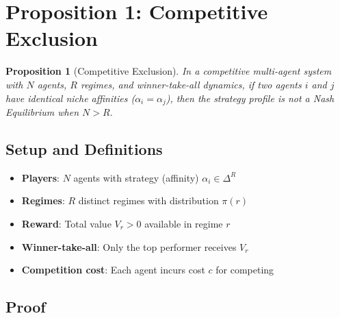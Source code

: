 \documentclass[11pt,a4paper]{article}
\theoremstyle{definition}
\theoremstyle{plain}
\newtheorem{proposition}{Proposition}[section]
\begin{document}
\section{Proposition 1: Competitive Exclusion}
\label{sec:prop1}

\begin{proposition}[Competitive Exclusion]
\label{prop:competitive-exclusion}
In a competitive multi-agent system with $N$ agents, $R$ regimes, and winner-take-all dynamics, if two agents $i$ and $j$ have identical niche affinities ($\alpha_i = \alpha_j$), then the strategy profile is not a Nash Equilibrium when $N > R$.
\end{proposition}

\subsection{Setup and Definitions}

\begin{itemize}
    \item \textbf{Players}: $N$ agents with strategy (affinity) $\alpha_i \in \Delta^R$
    \item \textbf{Regimes}: $R$ distinct regimes with distribution $\pi(r)$
    \item \textbf{Reward}: Total value $V_r > 0$ available in regime $r$
    \item \textbf{Winner-take-all}: Only the top performer receives $V_r$
    \item \textbf{Competition cost}: Each agent incurs cost $c$ for competing
\end{itemize}

\subsection{Proof}
\end{document}
